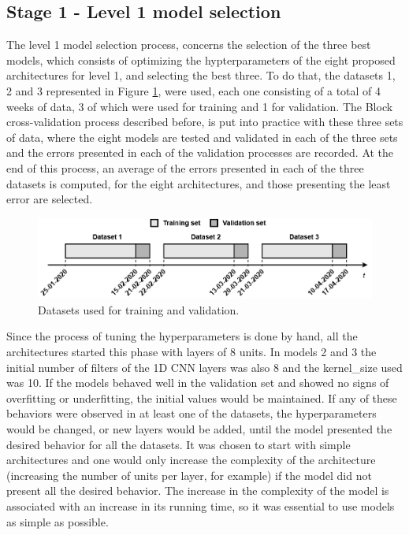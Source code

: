 \subsection{Stage 1 - Level 1 model selection}\label{sec:part1}

The level 1 model selection process, concerns the selection of the three best models, which consists of optimizing the hypterparameters of the eight proposed architectures for level 1, and selecting the best three. To do that, the datasets 1, 2 and 3 represented in Figure \ref{hyptun}, were used, each one consisting of a total of 4 weeks of data, 3 of which were used for training and 1 for validation. The Block cross-validation process described before, is put into practice with these three sets of data, where the eight models are tested and validated in each of the three sets and the errors presented in each of the validation processes are recorded. At the end of this process, an average of the errors presented in each of the three datasets is computed, for the eight architectures, and those presenting the least error are selected. 

\begin{figure}[h!]
    \centering
    \begin{center}
    \includegraphics[width=1\textwidth]{Images/hyptun_1.png}
    \caption{Datasets used for training and validation.}
    \label{hyptun}
    \end{center}
\end{figure}

Since the process of tuning the hyperparameters is done by hand, all the architectures started this phase with layers of 8 units. In models 2 and 3 the initial number of filters of the \ac{1D CNN} layers was also 8 and the kernel\_size used was 10. If the models behaved well in the validation set and showed no signs of overfitting or underfitting, the initial values would be maintained. If any of these behaviors were observed in at least one of the datasets, the hyperparameters would be changed, or new layers would be added, until the model presented the desired behavior for all the datasets. It was chosen to start with simple architectures and one would only increase the complexity of the architecture (increasing the number of units per layer, for example) if the model did not present all the desired behavior. The increase in the complexity of the model is associated with an increase in its running time, so it was essential to use models as simple as possible. 


